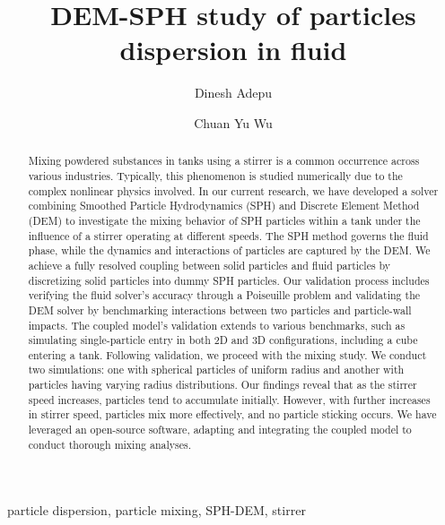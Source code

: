 \documentclass[preprint,12pt]{elsarticle}
\begin{document}
\begin{frontmatter}

  \title{{DEM}-{SPH} study of particles dispersion in fluid}
  \author[XXX]{Dinesh Adepu}
  \author[University of Surrey]{Chuan Yu Wu}
\address[xxx]{xxx}



\begin{abstract}
    Mixing powdered substances in tanks using a stirrer is a common occurrence
    across various industries. Typically, this phenomenon is studied
    numerically due to the complex nonlinear physics involved. In our current
    research, we have developed a solver combining Smoothed Particle
    Hydrodynamics (SPH) and Discrete Element Method (DEM) to investigate the
    mixing behavior of SPH particles within a tank under the influence of a
    stirrer operating at different speeds.  The SPH method governs the fluid
    phase, while the dynamics and interactions of particles are captured by
    the DEM. We achieve a fully resolved coupling between solid particles and
    fluid particles by discretizing solid particles into dummy SPH
    particles. Our validation process includes verifying the fluid solver's
    accuracy through a Poiseuille problem and validating the DEM solver by
    benchmarking interactions between two particles and particle-wall impacts.
    The coupled model's validation extends to various benchmarks, such as
    simulating single-particle entry in both 2D and 3D configurations,
    including a cube entering a tank. Following validation, we proceed with
    the mixing study. We conduct two simulations: one with spherical particles
    of uniform radius and another with particles having varying radius
    distributions.  Our findings reveal that as the stirrer speed increases,
    particles tend to accumulate initially. However, with further increases in
    stirrer speed, particles mix more effectively, and no particle sticking
    occurs. We have leveraged an open-source software, adapting and
    integrating the coupled model to conduct thorough mixing analyses.
\end{abstract}

\begin{keyword}
{particle dispersion}, {particle mixing}, {SPH-DEM}, {stirrer}


\end{keyword}

\end{frontmatter}
\end{document}
